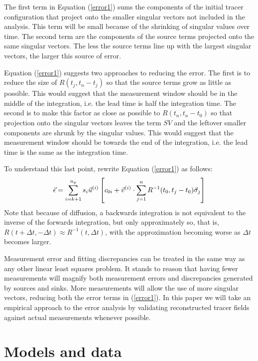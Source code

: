 The first term in Equation (\ref{error1}) sums the components of the initial tracer configuration that project onto the smaller singular vectors not included in the analysis. 
This term will be small because of the shrinking of singular values over time.
The second term are the components of the source terms projected onto the same singular vectors.
The less the source terms line up with the largest singular vectors, the
larger this source of error.

Equation (\ref{error1}) suggests two approaches to reducing the error.
The first is to reduce the size of $R(t_j, t_n-t_j)$ so that the source terms
grow as little as possible.
This would suggest that the measurement window should be in the middle
of the integration, i.e. the lead time is half the integration time.
The second is to make this factor as close as possible to $R(t_n, t_n-t_0)$
so that projection onto the singular vectors leaves the term $SV$ and
the leftover smaller components are shrunk by the singular values.
This would suggest that the measurement window should be towards the end
of the integration, i.e. the lead time is the same as the integration time.

To understand this last point, rewrite Equation (\ref{error1}) as follows:
\begin{equation}
	\vec \epsilon = \sum_{i=k+1}^{n_p} s_i \vec u^{(i)} \left [c_{0i}
	+ \vec v^{(i)} \cdot \sum_{j=1}^n R^{-1}(t_0, t_j-t_0) \vec \sigma_j \right ]
\end{equation}
Note that because of diffusion, 
a backwards integration is not equivalent to the inverse of the
forwards integration, but only approximately so, that is,
$R(t+\Delta t, -\Delta t) \approx R^{-1}(t, \Delta t)$, with the approximation
becoming worse as $\Delta t$ becomes larger.

Measurement error and fitting discrepancies can be treated in the same way 
as any other linear least squares problem. 
It stands to reason that having fewer measurements will magnify both
measurement errors and discrepancies generated by sources and sinks.
More measurements will allow the use of more singular vectors,
reducing both the error terms in (\ref{error1}).
In this paper we will take an empirical approach to the error analysis by
validating reconstructed tracer fields against actual measurements whenever
possible.

\section{Models and data}

